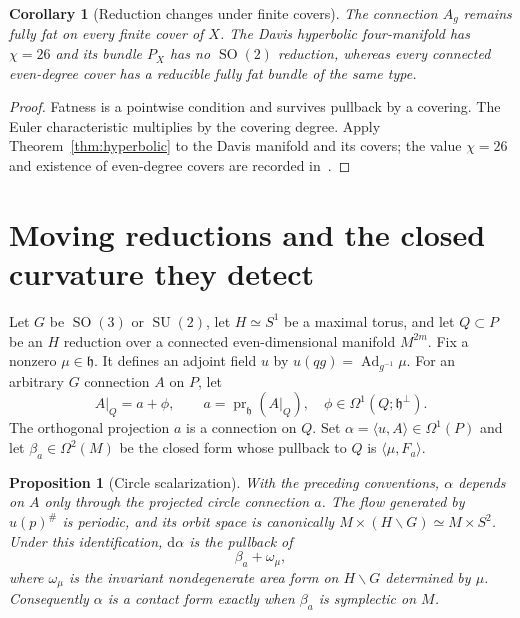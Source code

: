 \documentclass[11pt]{amsart}
\newcommand{\SO}{\operatorname{SO}}
\newcommand{\SU}{\operatorname{SU}}
\newcommand{\dd}{\mathrm d}
\theoremstyle{plain}
\newtheorem{proposition}[theorem]{Proposition}
\newtheorem{corollary}[theorem]{Corollary}
\theoremstyle{definition}
\theoremstyle{remark}
\begin{document}
\begin{corollary}[Reduction changes under finite covers]
The connection $A_g$ remains fully fat on every finite cover of $X$.
The Davis hyperbolic four-manifold has $\chi=26$ and its bundle
$P_X$ has no $\SO(2)$ reduction, whereas every connected even-degree
cover has a reducible fully fat bundle of the same type.
\end{corollary}

\begin{proof}
Fatness is a pointwise condition and survives pullback by a covering.
The Euler characteristic multiplies by the covering degree.  Apply
Theorem~\ref{thm:hyperbolic} to the Davis manifold and its covers;
the value $\chi=26$ and existence of even-degree covers are recorded
in~\cite[Example~14 and Corollary~12]{Kotschick}.
\end{proof}

\section{Moving reductions and the closed curvature they detect}

Let $G$ be $\SO(3)$ or $\SU(2)$, let $H\simeq S^1$ be a maximal
torus, and let $Q\subset P$ be an $H$ reduction over a connected
even-dimensional manifold $M^{2m}$.  Fix a nonzero
$\mu\in\mathfrak h$.  It defines an adjoint field $u$ by
$u(qg)=\operatorname{Ad}_{g^{-1}}\mu$.  For an arbitrary
$G$ connection $A$ on $P$, let
\begin{equation}\label{eq:decomposition}
 A|_Q=a+\phi,
 \qquad a=\operatorname{pr}_{\mathfrak h}(A|_Q),
 \quad\phi\in\Omega^1(Q;\mathfrak h^\perp).
\end{equation}
The orthogonal projection $a$ is a connection on $Q$.  Set
$\alpha=\langle u,A\rangle\in\Omega^1(P)$ and let
$\beta_a\in\Omega^2(M)$ be the closed form whose pullback to $Q$ is
$\langle\mu,F_a\rangle$.

\begin{proposition}[Circle scalarization]\label{prop:moving}
With the preceding conventions, $\alpha$ depends on $A$ only through
the projected circle connection $a$.  The flow generated by
$u(p)^\#$ is periodic, and its orbit space is canonically
$M\times(H\backslash G)\simeq M\times S^2$.  Under this
identification, $\dd\alpha$ is the pullback of
\begin{equation}\label{eq:product-form}
 \beta_a+\omega_\mu,
\end{equation}
where $\omega_\mu$ is the invariant nondegenerate area form on
$H\backslash G$ determined by $\mu$.  Consequently $\alpha$ is a
contact form exactly when $\beta_a$ is symplectic on $M$.
\end{proposition}
\end{document}
